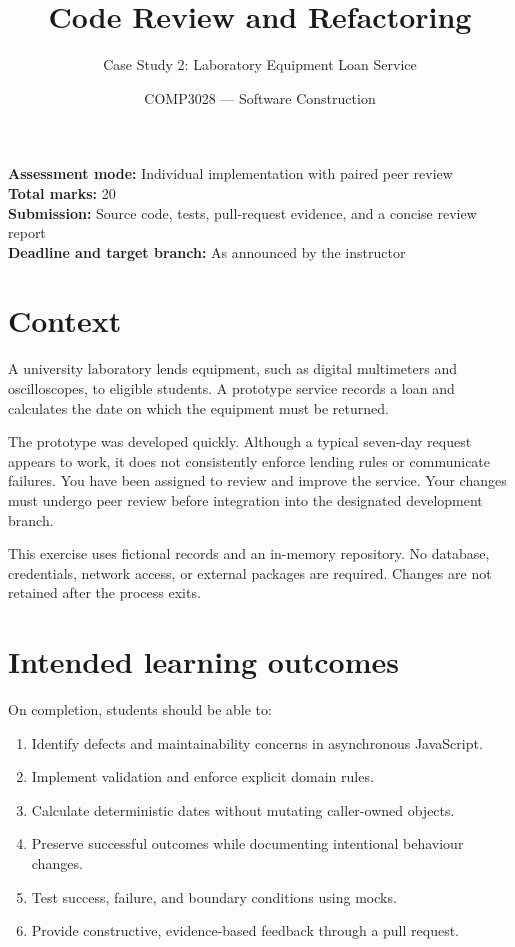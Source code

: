 \documentclass[
  11pt,
]{article}
\title{Code Review and Refactoring}
\subtitle{Case Study 2: Laboratory Equipment Loan Service}
\author{COMP3028 --- Software Construction}
\date{}
\providecommand{\tightlist}{%
  \setlength{\itemsep}{0pt}\setlength{\parskip}{0pt}}
\begin{document}
\maketitle

\textbf{Assessment mode:} Individual implementation with paired peer
review\\
\textbf{Total marks:} 20\\
\textbf{Submission:} Source code, tests, pull-request evidence, and a
concise review report\\
\textbf{Deadline and target branch:} As announced by the instructor

\hypertarget{context}{%
\section{Context}\label{context}}

A university laboratory lends equipment, such as digital multimeters and
oscilloscopes, to eligible students. A prototype service records a loan
and calculates the date on which the equipment must be returned.

The prototype was developed quickly. Although a typical seven-day
request appears to work, it does not consistently enforce lending rules
or communicate failures. You have been assigned to review and improve
the service. Your changes must undergo peer review before integration
into the designated development branch.

This exercise uses fictional records and an in-memory repository. No
database, credentials, network access, or external packages are
required. Changes are not retained after the process exits.

\hypertarget{intended-learning-outcomes}{%
\section{Intended learning outcomes}\label{intended-learning-outcomes}}

On completion, students should be able to:

\begin{enumerate}
\def\labelenumi{\arabic{enumi}.}
\tightlist
\item
  Identify defects and maintainability concerns in asynchronous
  JavaScript.
\item
  Implement validation and enforce explicit domain rules.
\item
  Calculate deterministic dates without mutating caller-owned objects.
\item
  Preserve successful outcomes while documenting intentional behaviour
  changes.
\item
  Test success, failure, and boundary conditions using mocks.
\item
  Provide constructive, evidence-based feedback through a pull request.
\end{enumerate}
\end{document}
